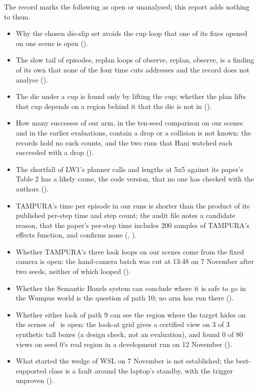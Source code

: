 The record marks the following as open or unanalysed; this report adds nothing to
them.
\begin{itemize}
  \item Why the chosen die-slip set avoids the cup loop that one of its fixes opened
  on one scene is open ().
  \item The slow tail of episodes, replan loops of observe, replan, observe, is a
  finding of its own that none of the four time cuts addresses and the record does
  not analyse ().
  \item The die under a cup is found only by lifting the cup; whether the plan lifts
  that cup depends on a region behind it that the die is not in ().
  \item How many successes of our arm, in the ten-seed comparison on our scenes and in
  the earlier evaluations, contain a drop or a collision is not known: the records hold
  no such counts, and the two runs that Hani watched each succeeded with a drop
  ().
  \item The shortfall of LW1's planner calls and lengths at 5x5 against its paper's
  Table 2 \cite{bonet2014flexible} has a likely cause, the code version, that no one has checked with the
  authors ().
  \item TAMPURA's time per episode in our runs is shorter than the product of its
  published per-step time and step count; the audit file notes a candidate reason, that
  the paper's per-step time includes 200 samples of TAMPURA's effects function, and
  confirms none (, ).
  \item Whether TAMPURA's three look loops on our scenes come from the fixed camera is
  open: the hand-camera batch was cut at 13:48 on 7 November after two seeds, neither of
  which looped ().
  \item Whether the Semantic Boxels system can conclude where it is safe to go in the
  Wumpus world is the question of path 10; no arm has run there ().
  \item Whether either look of path 9 can see the region where the target hides on the
  scenes of \fdice\ is open: the look-at grid gives a certified view on 3 of 3 synthetic
  tall boxes (a design check, not an evaluation), and found 0 of 80 views on seed 0's
  real region in a development run on 12 November ().
  \item What started the wedge of WSL on 7 November is not established; the best-supported
  class is a fault around the laptop's standby, with the trigger unproven ().
\end{itemize}

